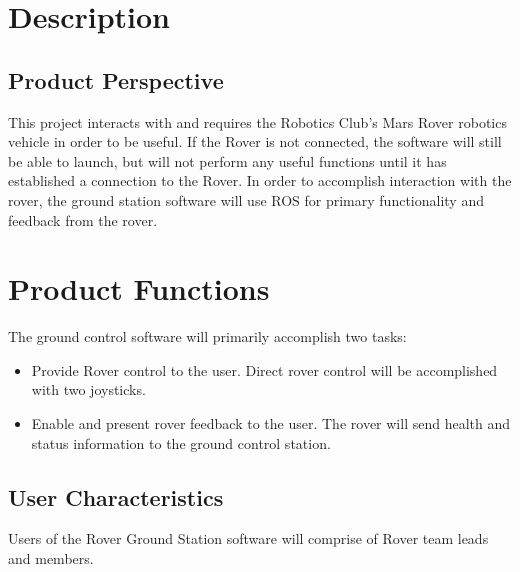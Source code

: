 \documentclass[onecolumn, draftclsnofoot, 10pt, compsoc]{IEEEtran}
\begin{document}
\section{Description}
\subsection{Product Perspective}
This project interacts with and requires the Robotics Club's Mars Rover robotics vehicle in order to be useful.
If the Rover is not connected, the software will still be able to launch, but will not perform any useful functions until it has established a connection to the Rover.
In order to accomplish interaction with the rover, the ground station software will use ROS for primary functionality and feedback from the rover.


\section{Product Functions}
The ground control software will primarily accomplish two tasks:
\begin{itemize}
\item Provide Rover control to the user.
Direct rover control will be accomplished with two joysticks.
\item Enable and present rover feedback to the user.
The rover will send health and status information to the ground control station.
\end{itemize}


\subsection{User Characteristics}
Users of the Rover Ground Station software will comprise of Rover team leads and members.
\end{document}
